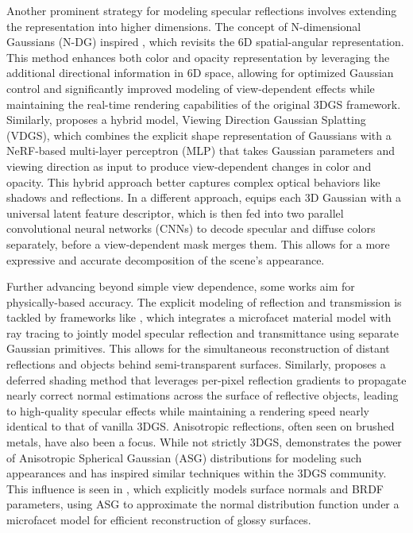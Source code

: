\documentclass[11pt]{article}
\begin{document}
Another prominent strategy for modeling specular reflections involves extending the representation into higher dimensions. The concept of N-dimensional Gaussians (N-DG) inspired \cite{ref600}, which revisits the 6D spatial-angular representation. This method enhances both color and opacity representation by leveraging the additional directional information in 6D space, allowing for optimized Gaussian control and significantly improved modeling of view-dependent effects while maintaining the real-time rendering capabilities of the original 3DGS framework. Similarly, \cite{ref601} proposes a hybrid model, Viewing Direction Gaussian Splatting (VDGS), which combines the explicit shape representation of Gaussians with a NeRF-based multi-layer perceptron (MLP) that takes Gaussian parameters and viewing direction as input to produce view-dependent changes in color and opacity. This hybrid approach better captures complex optical behaviors like shadows and reflections. In a different approach, \cite{ref602} equips each 3D Gaussian with a universal latent feature descriptor, which is then fed into two parallel convolutional neural networks (CNNs) to decode specular and diffuse colors separately, before a view-dependent mask merges them. This allows for a more expressive and accurate decomposition of the scene's appearance.

Further advancing beyond simple view dependence, some works aim for physically-based accuracy. The explicit modeling of reflection and transmission is tackled by frameworks like \cite{ref603}, which integrates a microfacet material model with ray tracing to jointly model specular reflection and transmittance using separate Gaussian primitives. This allows for the simultaneous reconstruction of distant reflections and objects behind semi-transparent surfaces. Similarly, \cite{ref604} proposes a deferred shading method that leverages per-pixel reflection gradients to propagate nearly correct normal estimations across the surface of reflective objects, leading to high-quality specular effects while maintaining a rendering speed nearly identical to that of vanilla 3DGS. Anisotropic reflections, often seen on brushed metals, have also been a focus. While not strictly 3DGS, \cite{ref605} demonstrates the power of Anisotropic Spherical Gaussian (ASG) distributions for modeling such appearances and has inspired similar techniques within the 3DGS community. This influence is seen in \cite{ref606}, which explicitly models surface normals and BRDF parameters, using ASG to approximate the normal distribution function under a microfacet model for efficient reconstruction of glossy surfaces.
\end{document}
